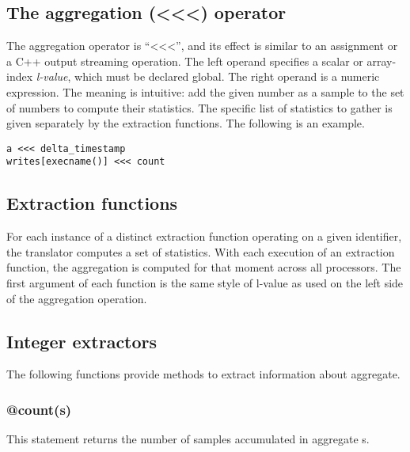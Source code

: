 \documentclass[twoside,english]{article}
\newenvironment{vindent}
{\begin{list}{}{\setlength{\listparindent}{6pt}}
\item[]}
{\end{list}}
\begin{document}
\subsection{The aggregation (\textless\hspace{1 sp}\textless\hspace{1 sp}\textless) operator}
\index{\textless\hspace{1 sp}\textless\hspace{1 sp}\textless}
The aggregation operator is {}``\textless\hspace{1 sp}\textless\hspace{1 sp}\textless'',
and its effect is similar to an assignment or a C++ output streaming operation.
The left operand specifies a scalar or array-index \emph{l-value}, which
must be declared global. The right operand is a numeric expression. The meaning
is intuitive: add the given number as a sample to the set of numbers to compute their
statistics. The specific list of statistics to gather is given separately
by the extraction functions. The following is an example.

\begin{vindent}
\begin{verbatim}
a <<< delta_timestamp
writes[execname()] <<< count
\end{verbatim}
\end{vindent}

\subsection{Extraction functions}
For each instance of a distinct extraction function operating on a given
identifier, the translator computes a set of statistics. With each execution
of an extraction function, the aggregation is computed for that moment across
all processors. The first argument of each function is the same style of
l-value as used on the left side of the aggregation operation.


\subsection{Integer extractors}

The following functions provide methods to extract information about aggregate.


\subsubsection{@count(s)}
This statement returns the number of samples accumulated in aggregate s.
\end{document}
